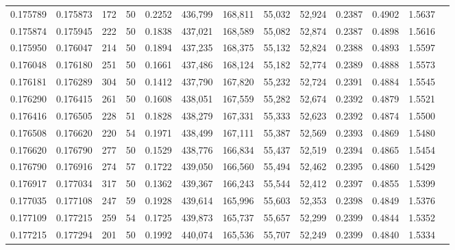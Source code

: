 \begin{tabular}{rrrrrrrrrrrrr}
0.175789 & 0.175873 &   172 &  50 &                                     0.2252 & 436,799 & 168,811 &  55,032 &  52,924 & 0.2387 & 0.4902 & 1.5637 \\
0.175874 & 0.175945 &   222 &  50 &                                     0.1838 & 437,021 & 168,589 &  55,082 &  52,874 & 0.2387 & 0.4898 & 1.5616 \\
0.175950 & 0.176047 &   214 &  50 &                                     0.1894 & 437,235 & 168,375 &  55,132 &  52,824 & 0.2388 & 0.4893 & 1.5597 \\
0.176048 & 0.176180 &   251 &  50 &                                     0.1661 & 437,486 & 168,124 &  55,182 &  52,774 & 0.2389 & 0.4888 & 1.5573 \\
0.176181 & 0.176289 &   304 &  50 &                                     0.1412 & 437,790 & 167,820 &  55,232 &  52,724 & 0.2391 & 0.4884 & 1.5545 \\
0.176290 & 0.176415 &   261 &  50 &                                     0.1608 & 438,051 & 167,559 &  55,282 &  52,674 & 0.2392 & 0.4879 & 1.5521 \\
0.176416 & 0.176505 &   228 &  51 &                                     0.1828 & 438,279 & 167,331 &  55,333 &  52,623 & 0.2392 & 0.4874 & 1.5500 \\
0.176508 & 0.176620 &   220 &  54 &                                     0.1971 & 438,499 & 167,111 &  55,387 &  52,569 & 0.2393 & 0.4869 & 1.5480 \\
0.176620 & 0.176790 &   277 &  50 &                                     0.1529 & 438,776 & 166,834 &  55,437 &  52,519 & 0.2394 & 0.4865 & 1.5454 \\
0.176790 & 0.176916 &   274 &  57 &                                     0.1722 & 439,050 & 166,560 &  55,494 &  52,462 & 0.2395 & 0.4860 & 1.5429 \\
0.176917 & 0.177034 &   317 &  50 &                                     0.1362 & 439,367 & 166,243 &  55,544 &  52,412 & 0.2397 & 0.4855 & 1.5399 \\
0.177035 & 0.177108 &   247 &  59 &                                     0.1928 & 439,614 & 165,996 &  55,603 &  52,353 & 0.2398 & 0.4849 & 1.5376 \\
0.177109 & 0.177215 &   259 &  54 &                                     0.1725 & 439,873 & 165,737 &  55,657 &  52,299 & 0.2399 & 0.4844 & 1.5352 \\
0.177215 & 0.177294 &   201 &  50 &                                     0.1992 & 440,074 & 165,536 &  55,707 &  52,249 & 0.2399 & 0.4840 & 1.5334 \\

\end{tabular}
